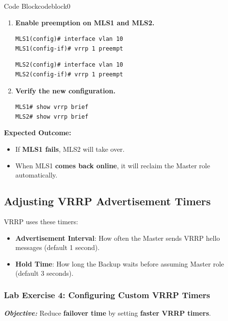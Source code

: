 \documentclass[a4paper]{book}
\begin{document}
\begin{ocg}{Code Block}{codeblock}{0}

\vspace{0.5cm}
\begin{enumerate}
\item \textbf{Enable preemption on MLS1 and MLS2.}
\begin{lstlisting}
MLS1(config)# interface vlan 10
MLS1(config-if)# vrrp 1 preempt
\end{lstlisting}
\begin{lstlisting}
MLS2(config)# interface vlan 10
MLS2(config-if)# vrrp 1 preempt
\end{lstlisting}

\item \textbf{Verify the new configuration.}
\begin{lstlisting}
MLS1# show vrrp brief
MLS2# show vrrp brief
\end{lstlisting}
\end{enumerate}
\end{ocg}




\textbf{Expected Outcome:}
\begin{itemize}
\item If \textbf{MLS1 fails}, MLS2 will take over.
\item When MLS1 \textbf{comes back online}, it will reclaim the Master role automatically.
\end{itemize}

\subsection{Adjusting VRRP Advertisement Timers}
VRRP uses these timers:
\begin{itemize}
\item \textbf{Advertisement Interval}: How often the Master sends VRRP hello messages (default 
1 second).
\item \textbf{Hold Time}: How long the Backup waits before assuming Master role (default 3 seconds).
\end{itemize}

\subsubsection{Lab Exercise 4: Configuring Custom VRRP Timers}
\textbf{\textit{Objective:}} Reduce \textbf{failover time} by setting \textbf{faster VRRP timers}.
\vspace{1.5em}
\end{document}
